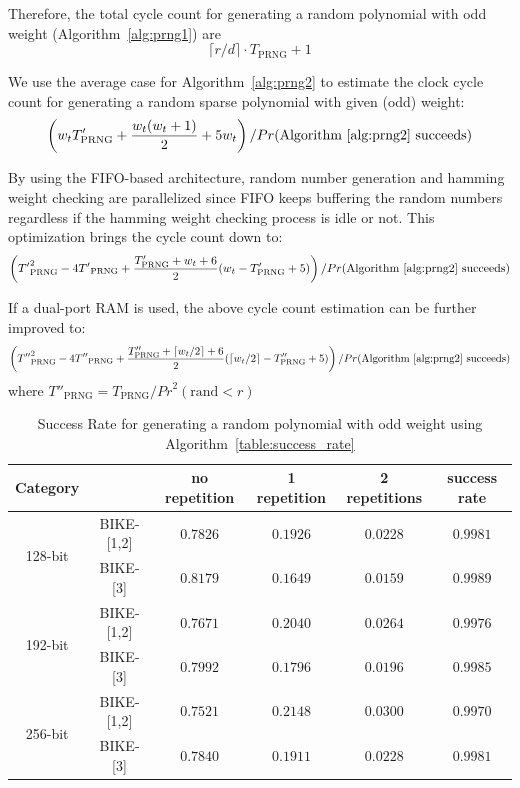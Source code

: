 \documentclass[runningheads]{llncs}
\begin{document}
Therefore, the total cycle count for generating a random polynomial with odd weight (Algorithm~\ref{alg:prng1}) are
\[
    \lceil r/d\rceil\cdot T_{\text{PRNG}} + 1
\]

We use the average case for Algorithm~\ref{alg:prng2} to estimate the clock cycle count for generating a random sparse polynomial with given (odd) weight:
\[
   \left(w_tT'_{\text{PRNG}} + \frac{w_t(w_t+1)}{2} + 5w_t\right)/Pr(\text{Algorithm~\ref{alg:prng2} succeeds})
\]

By using the FIFO-based architecture, random number generation and 
hamming weight checking are parallelized since FIFO keeps buffering 
the random numbers regardless if the hamming weight checking
process is idle or not. This optimization brings the cycle count down to:
\[
    \left({T'}_{\text{PRNG}}^2 - 4{T'}_{\text{PRNG}} + \frac{T'_{\text{PRNG}}+w_t+6}{2}(w_t-T'_{\text{PRNG}}+5)\right)/Pr(\text{Algorithm~\ref{alg:prng2} succeeds})
\]

If a dual-port RAM is used, the above cycle count estimation can be further improved to:
\[
    \left({T''}_{\text{PRNG}}^2 - 4{T''}_{\text{PRNG}} + \frac{T''_{\text{PRNG}}+\lceil w_t/2\rceil+6}{2}(\lceil w_t/2\rceil-T''_{\text{PRNG}}+5)\right)/Pr(\text{Algorithm~\ref{alg:prng2} succeeds})
\]
where ${T''}_{\text{PRNG}}=T_{\text{PRNG}}/{Pr}^2(\text{rand} < r)$

\begin{table}[!tb]\centering
\caption{Success Rate for generating a random polynomial with odd weight using Algorithm~\ref{table:success_rate}}
\begin{tabular}{cc|cccc}
  \hline
 \textbf{Category}        &             & no repetition & 1 repetition & 2 repetitions & success rate \\\hline
\multirow{ 2}{*}{128-bit} &  BIKE-[1,2] & $0.7826$ & $0.1926$  & $0.0228$  & $0.9981$\\
                    &  BIKE-[3] & $0.8179$ & $0.1649$  & $0.0159$  & $0.9989$\\
  \hline
\multirow{ 2}{*}{192-bit} &  BIKE-[1,2] & $0.7671$ & $0.2040$  & $0.0264$  & $0.9976$\\
                    &  BIKE-[3] & $0.7992$ & $0.1796$  & $0.0196$  & $0.9985$\\
  \hline
\multirow{ 2}{*}{256-bit} &  BIKE-[1,2] & $0.7521$ & $0.2148$  & $0.0300$  & $0.9970$\\
                    &  BIKE-[3] & $0.7840$ & $0.1911$  & $0.0228$  & $0.9981$\\
  \hline
\end{tabular}
\end{table}
\end{document}
